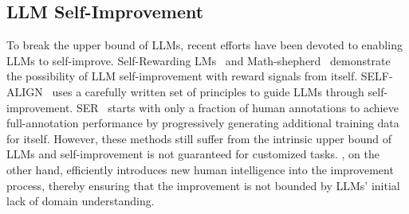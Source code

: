     
\vspace{-0.1in}
\subsection{LLM Self-Improvement}
\vspace{-0.05in}

To break the upper bound of LLMs, recent efforts have been devoted to enabling LLMs to self-improve. Self-Rewarding LMs~\cite{yuan2024self} and Math-shepherd~\cite{wang2024math} demonstrate the possibility of LLM self-improvement with reward signals from itself. SELF-ALIGN~\cite{sun2024principle} uses a carefully written set of principles to guide LLMs through self-improvement. SER~\cite{huang2024self} starts with only a fraction of human annotations to achieve full-annotation performance by progressively generating additional training data for itself. 
However, these methods still suffer from the intrinsic upper bound of LLMs and self-improvement is not guaranteed for customized tasks.
\myname{}, on the other hand, efficiently introduces new human intelligence into the improvement process, thereby ensuring that the improvement is not bounded by LLMs' initial lack of domain understanding.

